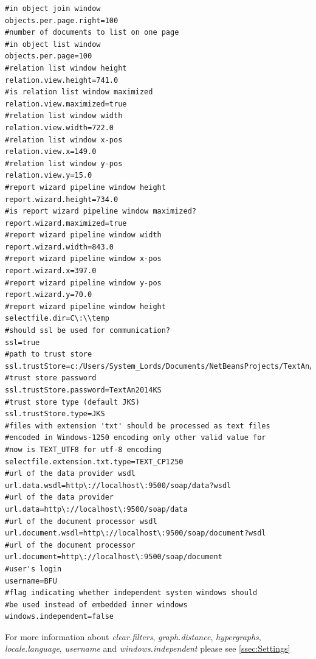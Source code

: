 \documentclass[12pt,a4paper]{report}
\begin{document}
\begin{lstlisting}[frame=single,language=properties]
#in object join window
objects.per.page.right=100
#number of documents to list on one page
#in object list window
objects.per.page=100
#relation list window height
relation.view.height=741.0
#is relation list window maximized
relation.view.maximized=true
#relation list window width
relation.view.width=722.0
#relation list window x-pos
relation.view.x=149.0
#relation list window y-pos
relation.view.y=15.0
#report wizard pipeline window height
report.wizard.height=734.0
#is report wizard pipeline window maximized?
report.wizard.maximized=true
#report wizard pipeline window width
report.wizard.width=843.0
#report wizard pipeline window x-pos
report.wizard.x=397.0
#report wizard pipeline window y-pos
report.wizard.y=70.0
#report wizard pipeline window height
selectfile.dir=C\:\\temp
#should ssl be used for communication?
ssl=true
#path to trust store
ssl.trustStore=c:/Users/System_Lords/Documents/NetBeansProjects/TextAn/Client/myTrustStore.localhost
#trust store password
ssl.trustStore.password=TextAn2014KS
#trust store type (default JKS)
ssl.trustStore.type=JKS
#files with extension 'txt' should be processed as text files
#encoded in Windows-1250 encoding only other valid value for
#now is TEXT_UTF8 for utf-8 encoding
selectfile.extension.txt.type=TEXT_CP1250
#url of the data provider wsdl
url.data.wsdl=http\://localhost\:9500/soap/data?wsdl
#url of the data provider
url.data=http\://localhost\:9500/soap/data
#url of the document processor wsdl
url.document.wsdl=http\://localhost\:9500/soap/document?wsdl
#url of the document processor
url.document=http\://localhost\:9500/soap/document
#user's login
username=BFU
#flag indicating whether independent system windows should
#be used instead of embedded inner windows
windows.independent=false
\end{lstlisting}

For more information about \emph{clear.filters}, \emph{graph.distance},
\emph{hypergraphs}, \emph{locale.language}, \emph{username}
and \emph{windows.independent} please see \ref{ssec:Settings}
\end{document}
